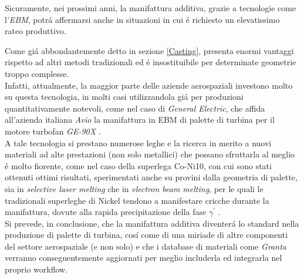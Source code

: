 \documentclass{article}
\begin{document}
    Sicuramente, nei prossimi anni, la manifattura additiva, grazie a tecnologie come l'\textit{EBM}, 
    potrá affermarsi anche in situazioni in cui é richiesto un elevatissimo rateo produttivo. 

    Come giá abbondantemente detto in sezione \ref{Casting}, presenta enormi vantaggi rispetto ad altri 
    metodi tradizionali ed é insostituibile per determinate geometrie troppo complesse. \\
    
    Infatti, attualmente, la maggior parte delle aziende aerospaziali investono molto su questa tecnologia, 
    in molti casi utilizzandola giá per produzioni quantitativamente notevoli, come 
    nel caso di \textit{General Electric}, che affida all'azienda italiana \textit{Avio} la manifattura
    in EBM di palette di turbina per il motore turbofan \textit{GE-90X} \autocite{GE90X_EBM}. \\

    A tale tecnologia si prestano numerose leghe e la ricerca in merito a nuovi materiali ad alte prestazioni (non
    solo metallici)
    che possano sfruttarla al meglio é molto fiorente, come nel caso della superlega Co-Ni10, 
    con cui sono stati ottenuti ottimi risultati, sperimentati anche su provini
    dalla geometria di palette, sia in 
    \textit{selective laser melting} che in \textit{electron beam melting}, per le quali
    le tradizionali superleghe di Nickel tendono a manifestare cricche durante la
    manifattura, dovute alla rapida precipitazione della fase $\gamma^{'}$ \autocite{Co_Ni_EBM}. \\ 

    Si prevede, in conclusione, che la manifattura additiva diventerá lo standard nella produzione di palette
    di turbina, cosí come di una miriade di 
    altre componenti del settore aerospaziale (e non solo) e che i database di materiali come \textit{Granta} verranno conseguentemente aggiornati per 
    meglio includerla ed integrarla nel proprio workflow. 

    

    \clearpage

    \printbibliography
    
\end{document}
